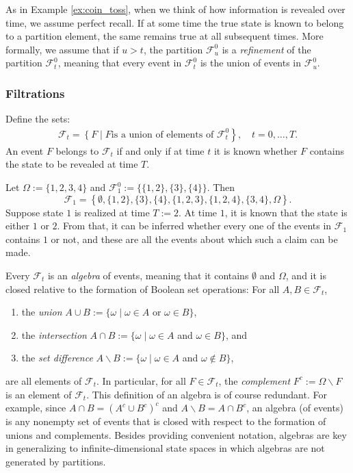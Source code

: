 \documentclass[\topdir/lecture\_notes.tex]{subfiles}
\begin{document}
As in Example \ref{ex:coin_toss}, when we think of how information is revealed over time, we assume perfect recall. If at some time the true state is known to belong to a partition element, the same remains true at all subsequent times. More formally, we assume that if \(u>t\), the partition \(\mathcal{F}_{u}^{0}\) is a \emph{refinement} of the partition \(\mathcal{F}_{t}^{0}\), meaning that every event in \(\mathcal{F}_{t}^{0}\) is the union of events in \(\mathcal{F}_{u}^{0}\).

\subsubsection*{Filtrations}
Define the sets:
\begin{align}
\mathcal{F}_{t}=\left\{F \mid F\right. \text{is a union of elements of }\left.\mathcal{F}_{t}^{0}\right\}, \quad t=0, \ldots, T.
\end{align}
An event \(F\) belongs to \(\mathcal{F}_{t}\) if and only if at time \(t\) it is known whether \(F\) contains the state to be revealed at time \(T\).

\begin{example}
Let \(\Omega :=\{1,2,3,4\}\) and \(\mathcal{F}_{1}^{0} :=\{\{1,2\},\{3\},\{4\}\}\). Then
\[
\mathcal{F}_{1}=\left\{\emptyset,\{1,2\},\{3\},\{4\},\{1,2,3\},\{1,2,4\},\{3,4\}, \Omega \right\}.
\]
Suppose state \(1\) is realized at time \(T := 2\). At time \(1\), it is known that the state is either \(1\) or \(2\). From that, it can be inferred whether every one of the events in \(\mathcal{F}_{1}\) contains \(1\) or not, and these are all the events about which such a claim can be made.
\end{example}

Every \(\mathcal{F}_{t}\) is an \emph{algebra} of events, meaning that it contains \(\emptyset\) and \(\Omega\), and it is closed relative to the formation of Boolean set operations: For all \(A, B \in \mathcal{F}_{t}\), 
\begin{enumerate}
    \item the \emph{union} \(A \cup B :=\{\omega \mid \omega \in A\) or \(\omega \in B\}\),
    \item the \emph{intersection} \(A \cap B :=\{\omega \mid \omega \in A\) and \(\omega \in B\}\), and 
    \item the \emph{set difference} \(A \backslash B :=\{\omega \mid \omega \in A\) and \(\omega \notin B\}\),
\end{enumerate}
are all elements of \(\mathcal{F}_{t}\). In particular, for all \(F \in \mathcal{F}_{t}\), the \emph{complement} \(F^{c} := \Omega \backslash F\) is an element of \(\mathcal{F}_{t}\). This definition of an algebra is of course redundant. For example, since \(A \cap B=(A^{c} \cup B^{c})^{c}\) and \(A \backslash B=A \cap B^{c}\), an algebra (of events) is any nonempty set of events that is closed with respect to the formation of unions and complements. Besides providing convenient notation, algebras are key in generalizing to infinite-dimensional state spaces in which algebras are not generated by partitions.
\end{document}
